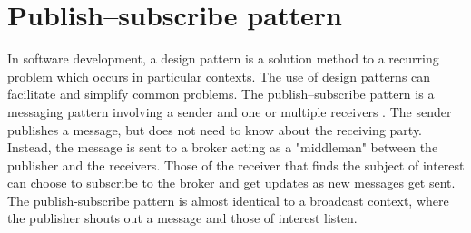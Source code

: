 \section{Publish–subscribe pattern}
\label{chap:pubsub}
In software development, a design pattern is a solution method to a recurring problem which occurs in particular contexts. The use of design patterns can facilitate and simplify common problems. The publish–subscribe pattern is a messaging pattern involving a sender and one or multiple receivers \cite{pus_sub}. The sender publishes a message, but does not need to know about the receiving party. Instead, the message is sent to a broker acting as a "middleman" between the publisher and the receivers. Those of the receiver that finds the subject of interest can choose to subscribe to the broker and get updates as new messages get sent. The publish-subscribe pattern is almost identical to a broadcast context, where the publisher shouts out a message and those of interest listen.